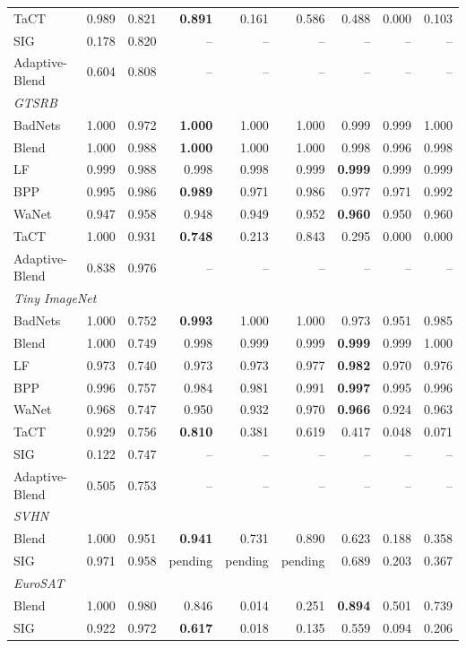 \begin{table}[htbp]
\begin{tabular}{lrrrrrrrr}
TaCT & 0.989 & 0.821 & \textbf{0.891} & 0.161 & 0.586 & 0.488 & 0.000 & 0.103 \\
SIG & 0.178 & 0.820 & -- & -- & -- & -- & -- & -- \\
Adaptive-Blend & 0.604 & 0.808 & -- & -- & -- & -- & -- & -- \\
\midrule
\multicolumn{9}{l}{\textit{GTSRB}} \\
BadNets & 1.000 & 0.972 & \textbf{1.000} & 1.000 & 1.000 & 0.999 & 0.999 & 1.000 \\
Blend & 1.000 & 0.988 & \textbf{1.000} & 1.000 & 1.000 & 0.998 & 0.996 & 0.998 \\
LF & 0.999 & 0.988 & 0.998 & 0.998 & 0.999 & \textbf{0.999} & 0.999 & 0.999 \\
BPP & 0.995 & 0.986 & \textbf{0.989} & 0.971 & 0.986 & 0.977 & 0.971 & 0.992 \\
WaNet & 0.947 & 0.958 & 0.948 & 0.949 & 0.952 & \textbf{0.960} & 0.950 & 0.960 \\
TaCT & 1.000 & 0.931 & \textbf{0.748} & 0.213 & 0.843 & 0.295 & 0.000 & 0.000 \\
Adaptive-Blend & 0.838 & 0.976 & -- & -- & -- & -- & -- & -- \\
\midrule
\multicolumn{9}{l}{\textit{Tiny ImageNet}} \\
BadNets & 1.000 & 0.752 & \textbf{0.993} & 1.000 & 1.000 & 0.973 & 0.951 & 0.985 \\
Blend & 1.000 & 0.749 & 0.998 & 0.999 & 0.999 & \textbf{0.999} & 0.999 & 1.000 \\
LF & 0.973 & 0.740 & 0.973 & 0.973 & 0.977 & \textbf{0.982} & 0.970 & 0.976 \\
BPP & 0.996 & 0.757 & 0.984 & 0.981 & 0.991 & \textbf{0.997} & 0.995 & 0.996 \\
WaNet & 0.968 & 0.747 & 0.950 & 0.932 & 0.970 & \textbf{0.966} & 0.924 & 0.963 \\
TaCT & 0.929 & 0.756 & \textbf{0.810} & 0.381 & 0.619 & 0.417 & 0.048 & 0.071 \\
SIG & 0.122 & 0.747 & -- & -- & -- & -- & -- & -- \\
Adaptive-Blend & 0.505 & 0.753 & -- & -- & -- & -- & -- & -- \\
\midrule
\multicolumn{9}{l}{\textit{SVHN}} \\
Blend & 1.000 & 0.951 & \textbf{0.941} & 0.731 & 0.890 & 0.623 & 0.188 & 0.358 \\
SIG & 0.971 & 0.958 & pending & pending & pending & 0.689 & 0.203 & 0.367 \\
\midrule
\multicolumn{9}{l}{\textit{EuroSAT}} \\
Blend & 1.000 & 0.980 & 0.846 & 0.014 & 0.251 & \textbf{0.894} & 0.501 & 0.739 \\
SIG & 0.922 & 0.972 & \textbf{0.617} & 0.018 & 0.135 & 0.559 & 0.094 & 0.206 \\
\bottomrule
\end{tabular}
\end{table}
